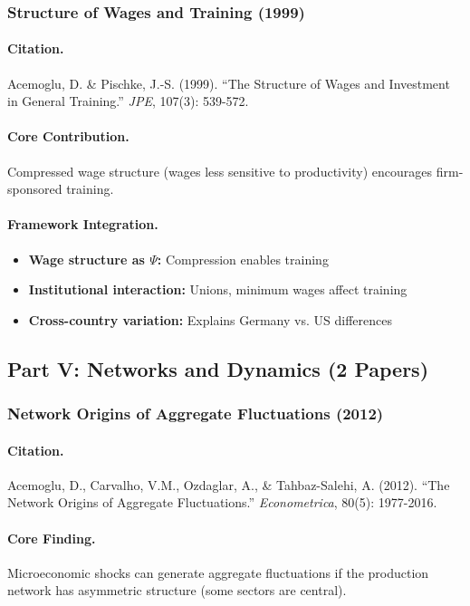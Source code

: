 \subsubsection{Structure of Wages and Training (1999)}

\paragraph{Citation.}
Acemoglu, D. \& Pischke, J.-S. (1999).
``The Structure of Wages and Investment in General Training.''
\emph{JPE}, 107(3): 539-572.

\paragraph{Core Contribution.}
Compressed wage structure (wages less sensitive to productivity)
encourages firm-sponsored training.

\paragraph{Framework Integration.}
\begin{itemize}
  \item \textbf{Wage structure as $\Psi$:} Compression enables training
  \item \textbf{Institutional interaction:} Unions, minimum wages affect training
  \item \textbf{Cross-country variation:} Explains Germany vs. US differences
\end{itemize}

\subsection{Part V: Networks and Dynamics (2 Papers)}

\subsubsection{Network Origins of Aggregate Fluctuations (2012)}

\paragraph{Citation.}
Acemoglu, D., Carvalho, V.M., Ozdaglar, A., \& Tahbaz-Salehi, A. (2012).
``The Network Origins of Aggregate Fluctuations.'' \emph{Econometrica}, 80(5): 1977-2016.

\paragraph{Core Finding.}
Microeconomic shocks can generate aggregate fluctuations if the production
network has asymmetric structure (some sectors are central).

